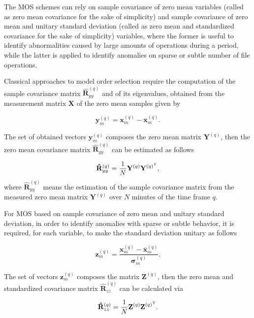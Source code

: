 \documentclass[twocolumn]{svjour3}          	%
\begin{document}
The MOS schemes can rely on sample covariance of zero mean variables (called as zero mean covariance for the sake of simplicity) and sample covariance of zero mean and unitary standard deviation (called as zero mean and standardized covariance for the sake of simplicity) variables, where the former is useful to identify abnormalities caused by large amounts of operations during a period, while the latter is applied to identify anomalies on sparse or subtle number of file operations.

Classical approaches to model order selection require the computation of the sample covariance matrix $\mathbf{\hat{R}}_{yy}^{(q)}$ and of its eigenvalues, obtained from the measurement matrix $\mathbf{X}$ of the zero mean samples given by

\begin{equation}\label{eq:eq03}
\mathbf{y}_{m}^{(q)} = \mathbf{x}_{m}^{(q)} - \bar{\mathbf{x}}_{m}^{(q)}.
\end{equation}

The set of obtained vectors $\mathbf{y}_{m}^{(q)}$ composes the zero mean matrix $\mathbf{Y}^{(q)}$, then the zero mean covariance matrix $\mathbf{\hat{R}}_{yy}^{(q)}$ can be estimated as follows

\begin{equation}\label{eq:eq04}
\mathbf{\hat{R}}_{yy}^{(q)} = \frac{1}{N}\mathbf{Y}^{(q)}\mathbf{Y}^{(q)^{\rm T}},
\end{equation}
where $\mathbf{\hat{R}}_{yy}^{(q)}$ means the estimation of the sample covariance matrix from the measured zero mean matrix $\mathbf{Y}^{(q)}$ over $N$ minutes of the time frame $q$. 


For MOS based on sample covariance of zero mean and unitary standard deviation, in order to identify anomalies with sparse or subtle behavior, it is required, for each variable, to make the standard deviation unitary as follows

\begin{equation}\label{eq:eq05}
\mathbf{z}_{m}^{(q)} = \frac{\mathbf{x}_{m}^{(q)} - \bar{\mathbf{x}}_{m}^{(q)}}{\mathbf{\sigma}_{m}^{(q)}}.
\end{equation}

The set of vectors $\mathbf{z}_{m}^{(q)}$ composes the matrix $\mathbf{Z}^{(q)}$, then the zero mean and standardized covariance matrix $\mathbf{\hat{R}}_{zz}^{(q)}$ can be calculated via 

\begin{equation}\label{eq:eq06}
\mathbf{\hat{R}}_{zz}^{(q)} = \frac{1}{N}\mathbf{Z}^{(q)}\mathbf{Z}^{(q)^{\rm T}}.
\end{equation}
\end{document}

